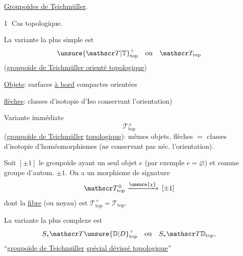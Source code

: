 
\uline{Groupoïdes de Teichmüller}.

\textcircled{1} Cas topologique.

La variante la plus simple est
\[
{\unsure{\mathscr T|\mathbb T}}_{\mathrm{top}}^{+}\quad\text{ou}\quad\mathscr T_{\mathrm{top}}
\]
(\uline{groupoïde de Teichmüller \uline{orienté} topologique})


\uline{Objets}: surfaces \uline{à bord} compactes orientées

\uline{flèches}: classes d'isotopie d'Iso conservant l'orientation)

Variante immédiate
\[
\mathscr T_{\mathrm{top}}^{\pm}
\]
(\uline{groupoïde de Teichmüller}  \uline{topologique}): mêmes objets, flèches $=$  classes d'isotopie d'homéomorphismes (ne conservant pas néc. l'orientation).

Soit $[\pm1]$ le groupoïde ayant un seul objet $e$ (par exemple $e=\varnothing$) et comme groupe d'autom. $\pm1$. On a un morphisme de signature
\[
\mathscr T_{\mathrm{top}}^{\pm}\xrightarrow{\unsure{\chi}}\,[\pm1]
\]
dont la \uline{fibre}  (ou noyau) est $\mathscr T_{\mathrm{top}}^{+}=\mathscr T_{\mathrm{top}}$.


La variante la plus complexe est
\[
S_{*}\mathscr T{\unsure{\mathbb D|D}}_{\mathrm{top}}^{+}\quad\text{ou}\quad S_{*}\mathscr T\mathbb D_{\mathrm{top}},
\]
``\uline{groupoïde de Teichmüller}  \uline{spécial dévissé topologique}''

